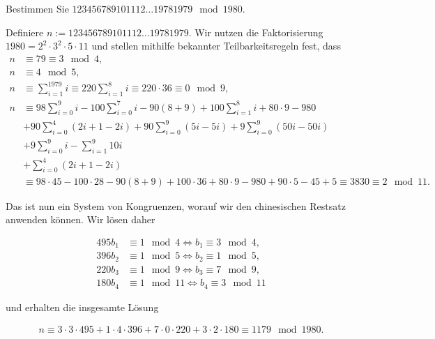 
\begin{exercise}

Bestimmen Sie $123456789101112\dots19781979 \mod{1980}$.

\end{exercise}


\begin{solution}
Definiere $n := 123456789101112\dots19781979$.
Wir nutzen die Faktorisierung $1980 = 2^2\cdot 3^2\cdot 5 \cdot 11$
und stellen mithilfe bekannter Teilbarkeitsregeln fest, dass 
\begin{align*}
    n &\equiv 79 \equiv 3 \mod{4}, \\
    n &\equiv 4 \mod{5}, \\
    n &\equiv \sum_{i=1}^{1979} i \equiv 220\sum_{i=1}^8 i \equiv 220\cdot 36 \equiv 0 \mod{9}, \\
    n &\equiv 98\sum_{i=0}^9 i - 100\sum_{i=0}^7 i - 90(8 + 9)
    + 100\sum_{i=1}^8 i + 80\cdot 9 - 980 \\
    &+ 90\sum_{i=0}^4 (2i + 1 - 2i) + 90\sum_{i=0}^9(5i-5i) + 9\sum_{i=0}^9(50i - 50i)\\
    &+ 9\sum_{i=0}^9 i - \sum_{i=1}^9 10i\\
    &+ \sum_{i=0}^{4} (2i + 1 - 2i) \\
    &\equiv 98 \cdot 45 - 100 \cdot 28 - 90(8 + 9) + 100 \cdot36 + 
    80 \cdot 9 - 980 + 90 \cdot 5 -45 + 5 \equiv 3830 \equiv 2 \mod{11}.
\end{align*}

Das ist nun ein System von Kongruenzen, worauf wir den chinesischen
Restsatz anwenden können. Wir lösen daher

\begin{align*}
    495b_1 &\equiv 1 \mod{4} \iff b_1 \equiv 3 \mod{4}, \\
    396b_2 &\equiv 1 \mod{5} \iff b_2 \equiv 1 \mod{5}, \\
    220b_3 &\equiv 1 \mod{9} \iff b_3 \equiv 7 \mod{9}, \\
    180b_4 &\equiv 1 \mod{11} \iff b_4 \equiv 3 \mod{11}
\end{align*}

und erhalten die insgesamte Lösung

\begin{align*}
    n \equiv 3 \cdot 3 \cdot 495 + 1 \cdot 4 \cdot 396 
    + 7 \cdot 0 \cdot 220 + 3 \cdot 2 \cdot 180 \equiv 1179 \mod{1980}.
\end{align*}

\end{solution}

